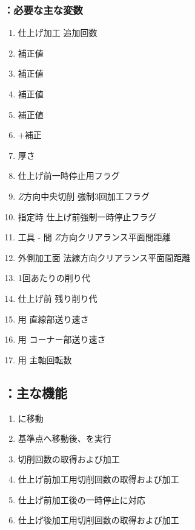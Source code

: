\clearpage
\subsubsection{\KKeywayConerLeft：必要な主な変数}
\begin{enumerate}[label*=\sarrow]
\item \Keyway{} 仕上げ加工 追加回数
\item \KeywayPos{} 補正値
\item \KeywayWidth{} 補正値
\item \AsideKeywayDepth{} 補正値
\item \KeywayDiameter{} 補正値
\item \BottomOutcutWidth$+$補正
\item \SideCutter 厚さ
\item \Keyway 仕上げ前一時停止用フラグ
\item \KeywayWidth$Z$方向中央切削 強制3回加工フラグ
\item \AsideKeywayDepth 指定時 仕上げ前強制一時停止フラグ
\item 工具 - \EndFace 間 $Z$方向クリアランス平面間距離
\item 外側加工面 法線方向クリアランス平面間距離
\item \KeywayMilling1回あたりの削り代
\item \KeywayMilling{} 仕上げ前 残り削り代
\item \KeywayMilling 用 直線部送り速さ
\item \KeywayMilling 用 コーナー部送り速さ
\item \KeywayMilling 用 主軸回転数
\end{enumerate}


\subsection{\KKeywayConerLeft：主な機能}
\begin{enumerate}[label*=\sarrow]
\item \KeywayMillingReferencePoint に移動
\item 基準点へ移動後、\KOLeftFS を実行
\item \KeywayWidth 切削回数の取得および加工
\item 仕上げ前加工用切削回数の取得および加工
\item 仕上げ前加工後の一時停止\OpauseCheck に対応
\item 仕上げ後加工用切削回数の取得および加工
\end{enumerate}


